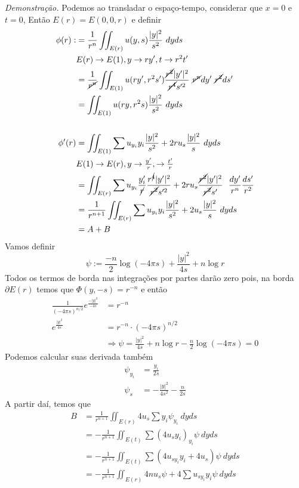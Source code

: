 \documentclass[11pt]{article}
\newcommand{\p}{\partial}
\begin{document}
\textit{Demonstração.} Podemos ao transladar o espaço-tempo, considerar que \(x=0\) e \(t=0\), Então \(E(r) = E(0,0,r)\) e definir \begin{align*}
	\phi(r) :&= \frac{1}{r^n} \iint_{E(r)} u(y,s) \frac{|y|^2}{s^2}\ dy ds\\
	&E(r)\rightarrow E(1), y \rightarrow ry', t\rightarrow r^2t'\\
	&= \frac{1}{\cancel{r^n}} \iint_{E(1)} u(ry', r^2s') \frac{\cancel{r^2}|y'|^2}{\cancel{r^4}s'^2}\ \cancel{r^n}dy'\ \cancel{r^2}ds'\\  
	&=\iint_{E(1)} u(ry, r^2s) \frac{|y|^2}{s^2}\ dyds\\
	\\
	\phi'(r) &= \iint_{E(1)} \sum u_{y_i}y_i\frac{|y|^2}{s^2} + 2ru_s\frac{|y|^2}{s}\ dyds\\
	&E(1)\rightarrow E(r), y \rightarrow \tfrac{y'}{r}, \rightarrow \tfrac{t'}{r}\\
	&=\iint_{E(r)} \sum u_{y_i}\frac{y'_i}{\cancel{r}}\frac{r^{\cancel{4}}|y'|^2}{\cancel{r^2} s'^2} + 2ru_s\frac{\cancel{r^2}|y'|^2}{\cancel{r^2}s'}\ \  \frac{dy'}{r^n}\frac{ds'}{r^2}\\
	&= \frac{1}{r^{n+1}} \iint_{E(r)} \sum u_{y_i}y_i\frac{|y|^2}{s^2} + 2u_s\frac{|y|^2}{s}\ dyds\\
	&= A + B
\end{align*}
Vamos definir \[\psi := \frac{-n}{2}\log (-4\pi s) + \frac{|y|^2}{4s} + n\log r\]
Todos os termos de borda nas integrações por partes darão zero pois, na borda \(\p E(r)\) temos que \(\Phi(y,-s)=r^{-n}\) e então\begin{align*}
	\frac{1}{(-4\pi s)^{n/2}} e^{\frac{-|y|^2}{-4s}}&=r^{-n} \\
	e^{\frac{|y|^2}{4s}} &= r^{-n}\cdot (-4\pi s)^{n/2} \\
	&\Rightarrow \psi = \frac{|y|^2}{4s} +n \log r -\frac{n}{2}\log(-4\pi s) =0
\end{align*}
Podemos calcular suas derivada também \begin{align*}
	\psi_{y_i} &=  \frac{y_i}{2s}\\
	\psi_s &= - \frac{|y|^2}{4s^2} -\frac{n}{2s}
\end{align*}
A partir daí, temos que \begin{align*}
	B &= \frac{1}{r^{n+1}}\iint_{E(r)} 4u_s \sum y_i \psi_{y_i}\ dy ds\\
	&=-\frac{1}{r^{n+1}} \iint_{E(t)} \sum \left(4u_sy_i\right)_{y_i} \psi\ dy ds\\
	&=-\frac{1}{r^{n+1}} \iint_{E(t)} \sum \left(4u_{sy_i}y_i + 4u_s\right) \psi\ dy ds\\
	&= -\frac{1}{r^{n+1}}\iint_{E(r)} 4n u_s\psi + 4\sum u_{sy_i} y_i \psi \ dyds 
\end{align*}
\end{document}

